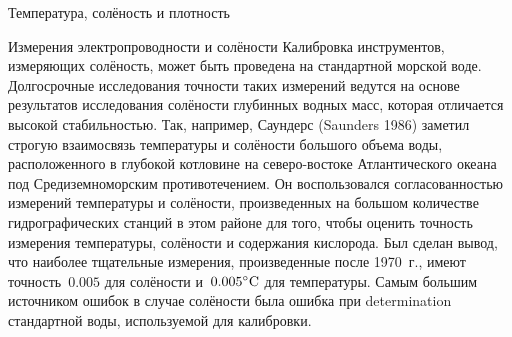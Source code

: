 \begin{chapter}{Температура, солёность и плотность}
\begin{section}{Измерения электропроводности и солёности}
Калибровка инструментов, измеряющих солёность, может быть проведена на
стандартной морской воде. Долгосрочные исследования точности таких измерений
ведутся на основе результатов исследования солёности глубинных водных масс,
которая отличается высокой стабильностью. Так, например, 
Саундерс (Saunders 1986) заметил строгую взаимосвязь температуры и солёности 
большого объема воды, расположенного в глубокой котловине на северо-востоке 
Атлантического океана под Средиземноморским противотечением. Он воспользовался
согласованностью измерений температуры и солёности, произведенных на большом
количестве гидрографических станций в этом районе для того, чтобы оценить 
точность измерения температуры, солёности и содержания кислорода. Был сделан 
вывод, что наиболее тщательные измерения, произведенные после 1970~г., имеют 
точность~$0.005$ для солёности и~${0.005}^\circ\mbox{C}$ для температуры. 
Самым большим источником ошибок в случае солёности была ошибка при 
determination стандартной воды, используемой для калибровки.
%


\end{section}
\end{chapter}
